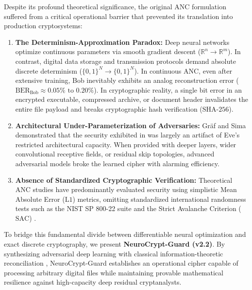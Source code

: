 \documentclass[journal,10pt,twocolumn]{IEEEtran}
\begin{document}
Despite its profound theoretical significance, the original ANC formulation suffered from a critical operational barrier that prevented its translation into production cryptosystems:
\begin{enumerate}
    \item \textbf{The Determinism-Approximation Paradox:} Deep neural networks optimize continuous parameters via smooth gradient descent ($\mathbb{R}^n \to \mathbb{R}^m$). In contrast, digital data storage and transmission protocols demand absolute discrete determinism ($\{0, 1\}^N \to \{0, 1\}^N$). In continuous ANC, even after extensive training, Bob inevitably exhibits an analog reconstruction error ($\text{BER}_{\text{Bob}} \approx 0.05\% \text{ to } 0.20\%$). In cryptographic reality, a single bit error in an encrypted executable, compressed archive, or document header invalidates the entire file payload and breaks cryptographic hash verification ($\text{SHA-256}$).
    \item \textbf{Architectural Under-Parameterization of Adversaries:} Gr{\"a}f and Sima \cite{graf2017analysis} demonstrated that the security exhibited in \cite{abadi2016learning} was largely an artifact of Eve's restricted architectural capacity. When provided with deeper layers, wider convolutional receptive fields, or residual skip topologies, advanced adversarial models broke the learned cipher with alarming efficiency.
    \item \textbf{Absence of Standardized Cryptographic Verification:} Theoretical ANC studies have predominantly evaluated security using simplistic Mean Absolute Error ($\text{L1}$) metrics, omitting standardized international randomness tests such as the NIST SP 800-22 suite \cite{rukhin2010statistical} and the Strict Avalanche Criterion ($\text{SAC}$) \cite{webster1985design}.
\end{enumerate}

To bridge this fundamental divide between differentiable neural optimization and exact discrete cryptography, we present \textbf{NeuroCrypt-Guard (v2.2)}. By synthesizing adversarial deep learning with classical information-theoretic reconciliation \cite{brassard2003secret,hamming1950error}, NeuroCrypt-Guard establishes an operational cipher capable of processing arbitrary digital files while maintaining provable mathematical resilience against high-capacity deep residual cryptanalysts.
\end{document}
